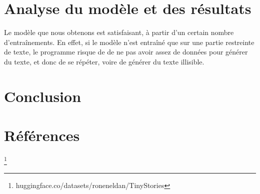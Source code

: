 \documentclass[12pt]{article}
\begin{document}
\section{Analyse du modèle et des résultats}

Le modèle que nous obtenons est satisfaisant, à partir d'un certain nombre d’entraînements. En effet, si le modèle n'est entraîné que sur une partie restreinte de texte, le programme risque de de ne pas avoir assez de données pour générer du texte, et donc de se répéter, voire de générer du texte illisible.\\



\section{Conclusion}

\section{Références}

\footnote[1]{huggingface.co/datasets/roneneldan/TinyStories}
\end{document}
